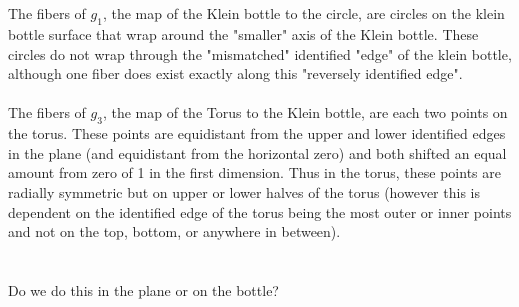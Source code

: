 \documentclass{jhwhw}
\begin{document}
\part{}%
The fibers of $g_1$, the map of the Klein bottle to the circle, are circles on the klein bottle surface that wrap around the "smaller" axis of the Klein bottle. These circles do not wrap through the "mismatched" identified "edge" of the klein bottle, although one fiber does exist exactly along this "reversely identified edge".
\\
\\
\noindent
The fibers of $g_3$, the map of the Torus to the Klein bottle, are each two points on the torus. These points are equidistant from the upper and lower identified edges in the plane (and equidistant from the horizontal zero) and both shifted an equal amount from zero of 1 in the first dimension. Thus in the torus, these points are radially symmetric but on upper or lower halves of the torus (however this is dependent on the identified edge of the torus being the most outer or inner points and not on the top, bottom, or anywhere in between).
\part{}%

Do we do this in the plane or on the bottle?
\end{document}
